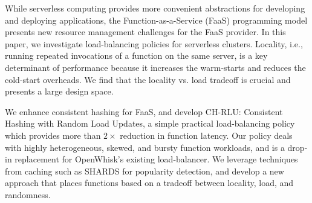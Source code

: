 While serverless computing provides more convenient abstractions for developing and deploying applications, the Function-as-a-Service (FaaS) programming model presents new resource management challenges for the FaaS provider. 
In this paper, we investigate load-balancing policies for serverless clusters.
Locality, i.e., running repeated invocations of a function on the same server, is a key determinant of performance because it increases the warm-starts and reduces the cold-start overheads. 
We find that the locality vs. load tradeoff is crucial and presents a large design space. 

We enhance consistent hashing for FaaS, and develop CH-RLU: Consistent Hashing with Random Load Updates, a simple practical load-balancing policy which provides more than $2\times$ reduction in function latency. 
Our policy deals with highly heterogeneous, skewed, and bursty function workloads, and is a drop-in replacement for OpenWhisk's existing load-balancer.
We leverage techniques from caching such as SHARDS for popularity detection, and develop a new approach that places functions based on a tradeoff between locality, load, and randomness. 





